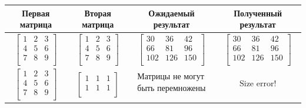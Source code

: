 \documentclass[12pt]{report}
\begin{document}
\begin{table}[h]
	\label{tabular:functional_test}
	\begin{center}
		\begin{tabular}{ | c | c | c | c |}
			\hline
			\textbf{Первая матрица} & \textbf{Вторая матрица} & \textbf{Ожидаемый результат} & \textbf{Полученный результат}\\ \hline
			$\begin{bmatrix} 
				1&2&3 \\
				4&5&6 \\ 
				7&8&9 \\ 
			\end{bmatrix}$ & 
			$\begin{bmatrix} 
				1&2&3 \\
				4&5&6 \\ 
				7&8&9 \\ 
			\end{bmatrix}$ &
			$\begin{bmatrix} 
				30&36&42 \\
				66&81&96 \\ 
				102&126&150 \\ 
			\end{bmatrix}$ &
			$\begin{bmatrix} 
				30&36&42 \\
				66&81&96 \\ 
				102&126&150 \\ 
			\end{bmatrix} $\\ 
			\hline
			
			
			$\begin{bmatrix} 
				1&2&3 \\
				4&5&6 \\ 
				7&8&9 \\ 
			\end{bmatrix}$ & 
			$\begin{bmatrix} 
				1&1&1 \\
				1&1&1 \\ 
			\end{bmatrix}$ &
			$\begin{matrix} 
				\text{Матрицы не могут} \\
				\text{быть перемножены} \\ 
			\end{matrix} $ &
			$\begin{matrix} 
				\text{Size error!} \\
			\end{matrix} $ \\
			\hline
			

\end{tabular}
\end{center}
\end{table}
\end{document}
